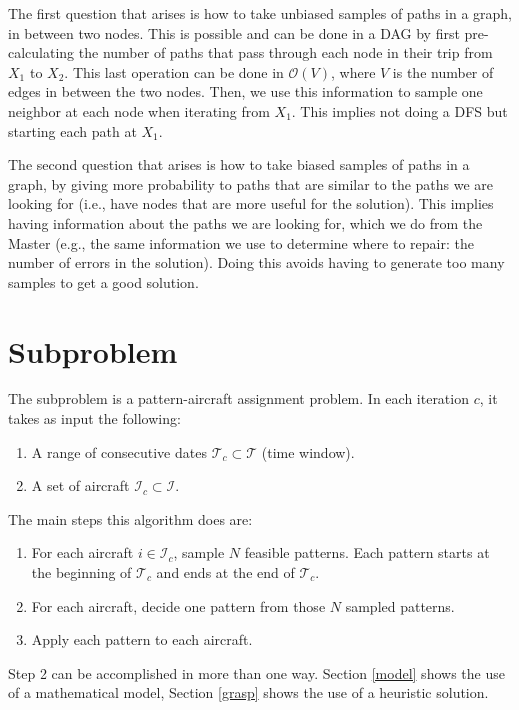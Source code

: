 \documentclass[a4paper,11pt]{article}
\begin{document}
    The first question that arises is how to take unbiased samples of paths in a graph, in between two nodes. This is possible and can be done in a DAG by first pre-calculating the number of paths that pass through each node in their trip from $X_1$ to $X_2$. This last operation can be done in $\mathcal{O}(V)$, where $V$ is the number of edges in between the two nodes. Then, we use this information to sample one neighbor at each node when iterating from $X_1$. This implies not doing a DFS but starting each path at $X_1$.

    The second question that arises is how to take biased samples of paths in a graph, by giving more probability to paths that are similar to the paths we are looking for (i.e., have nodes that are more useful for the solution). This implies having information about the paths we are looking for, which we do from the Master (e.g., the same information we use to determine where to repair: the number of errors in the solution). Doing this avoids having to generate too many samples to get a good solution.

\section{Subproblem}

  The subproblem is a pattern-aircraft assignment problem. 
  In each iteration $c$, it takes as input the following:

  \begin{enumerate}
    \item A range of consecutive dates $\mathcal{T}_{c} \subset \mathcal{T}$ (time window).
    \item A set of aircraft $\mathcal{I}_{c} \subset \mathcal{I}$.
  \end{enumerate}
  
  The main steps this algorithm does are:

  \begin{enumerate}
    \item For each aircraft $i \in \mathcal{I}_{c}$, sample $N$ feasible patterns. Each pattern starts at the beginning of $\mathcal{T}_{c}$ and ends at the end of $\mathcal{T}_{c}$.
    \item For each aircraft, decide one pattern from those $N$ sampled patterns.
    \item Apply each pattern to each aircraft.
  \end{enumerate}

  Step 2 can be accomplished in more than one way. Section \ref{model} shows the use of a mathematical model, Section \ref{grasp} shows the use of a heuristic solution.
\end{document}
